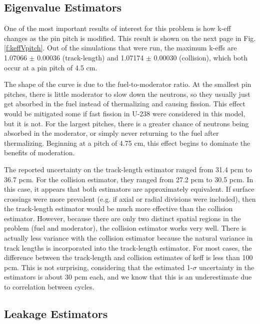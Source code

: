 \subsection{Eigenvalue Estimators}\label{ss:eigenvalue}

One of the most important results of interest for this problem is how k-eff changes as the pin pitch is modified.  This result is shown on the next page in Fig. \ref{f:keffVpitch}.  Out of the simulations that were run, the maximum k-effs are 1.07066 $\pm$ 0.00036 (track-length) and 1.07174 $\pm$ 0.00030 (collision), which both occur at a pin pitch of 4.5 cm.

The shape of the curve is due to the fuel-to-moderator ratio.  At the smallest pin pitches, there is little moderator to slow down the neutrons, so they usually just get absorbed in the fuel instead of thermalizing and causing fission.  This effect would be mitigated some if fast fission in U-238 were considered in this model, but it is not.  For the largest pitches, there is a greater chance of neutrons being absorbed in the moderator, or simply never returning to the fuel after thermalizing.  Beginning at a pitch of 4.75 cm, this effect begins to dominate the benefits of moderation.

The reported uncertainty on the track-length estimator ranged from 31.4 pcm to 36.7 pcm.  For the collision estimator, they ranged from 27.2 pcm to 30.5 pcm. In this case, it appears that both estimators are approximately equivalent. If surface crossings were more prevalent (e.g. if axial or radial divisions were included), then the track-length estimator would be much more effective than the collision estimator. However, because there are only two distinct spatial regions in the problem (fuel and moderator), the collision estimator works very well. There is actually less variance with the collision estimator because the natural variance in track lengths is incorporated into the track-length estimator. For most cases, the difference between the track-length and collision estimates of keff is less than 100 pcm. This is not surprising, considering that the estimated 1-$\sigma$ uncertainty in the estimators is about 30 pcm each, and we know that this is an underestimate due to correlation between cycles.

\subsection{Leakage Estimators}\label{ss:leakage}

